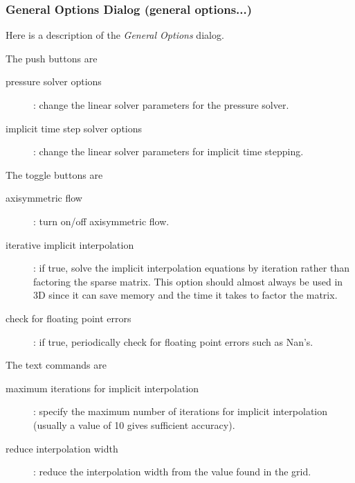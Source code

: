 \subsubsection{General Options Dialog (general options...)}\label{sec:generalOptions}

Here is a description of the {\em General Options} dialog.

\noindent The push buttons are
\begin{description}
  \item[\qquad pressure solver options] : change the linear solver parameters for the pressure solver.
  \item[\qquad implicit time step solver options] : change the linear solver parameters for implicit time stepping.
\end{description}

\noindent The toggle buttons are
\begin{description}
  \item[\qquad axisymmetric flow] : turn on/off axisymmetric flow. 
  \item[\qquad iterative implicit interpolation] : if true, solve the implicit interpolation equations by iteration
           rather than factoring the sparse matrix. This option should almost always be used in 3D since it 
            can save memory and the time it takes to factor the matrix. 
  \item[\qquad check for floating point errors] : if true, periodically check for floating point errors such as Nan's.
\end{description}

\noindent The text commands are
\begin{description}
  \item[\qquad maximum iterations for implicit interpolation] : specify the maximum number of iterations for implicit interpolation
             (usually a value of 10 gives sufficient accuracy). 
  \item[\qquad reduce interpolation width] : reduce the interpolation width from the value found in the grid. 
\end{description}

